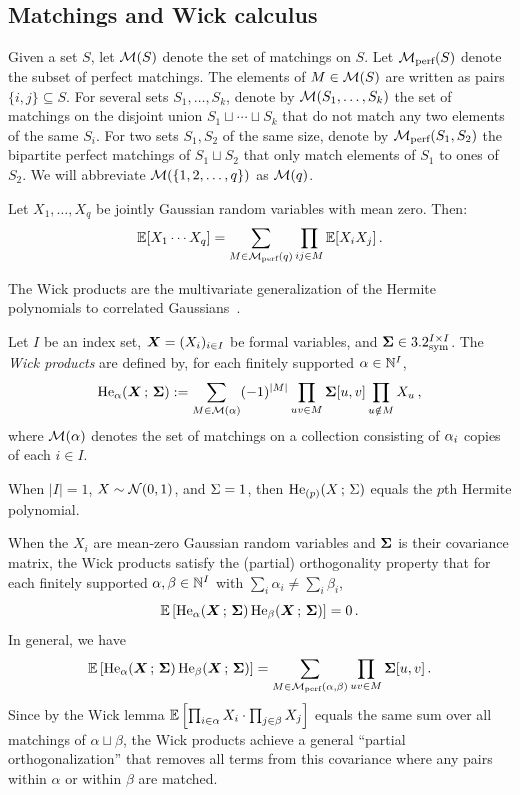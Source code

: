 \subsection{Matchings and Wick calculus}

Given a set $S$, let ${\cal M}(S)$ denote the set of matchings on $S$.
Let $\mathcal{M}_{\textnormal{perf}}(S)$ denote the subset of perfect matchings.
The elements of $M \in {\cal M}(S)$ are written as pairs $\{i,j\} \subseteq S$.
For several sets $S_1, \dots, S_k$, denote by ${\cal M}(S_1, \dots, S_k)$ the set of matchings on the disjoint union $S_1 \sqcup \cdots \sqcup S_k$ that do not match any two elements of the same $S_i$.
For two sets $S_1, S_2$ of the same size, denote by $\mathcal{M}_{\textnormal{perf}}(S_1, S_2)$ the bipartite perfect matchings of $S_1 \sqcup S_2$ that only match elements of $S_1$ to ones of $S_2$.
We will abbreviate ${\cal M}(\{1,2,\dots, q\})$ as ${\cal M}(q)$.

\begin{lemma}\label{lem:wick}
    Let $X_1, \dots, X_q$ be jointly Gaussian random variables with mean zero. Then:
    \begin{equation*}
        \operatorname*{\mathbb{E}}[X_1\cdots X_{q}] = \sum_{M \in \mathcal{M}_{\textnormal{perf}}(q)} \prod_{ij \in M} \operatorname*{\mathbb{E}}[X_iX_j]\,.
    \end{equation*}
\end{lemma}

The Wick products are the multivariate generalization of the Hermite polynomials to correlated Gaussians~\cite[Chapter 3]{Janson:GaussianHilbertSpaces}.

\begin{definition}
\label{def:wick}
    Let $I$ be an index set, ${\bm X} = (X_i)_{i \in I}$ be formal variables, and $\mathbf{\Sigma} \in 3.2_{\mathrm{sym}}^{I \times I}$. The {\em Wick products} are defined by, for each finitely supported $\alpha \in \mathbb{N}^I$,
    \[
       \operatorname{He}_{\alpha}({\bm X}\,;\, \mathbf{\Sigma}) := \sum_{M \in {\cal M}(\alpha)} (-1)^{|M|} \prod_{uv \in M}\mathbf{\Sigma}[u,v] \prod_{u\notin M} X_u\,,
    \]
    where ${\cal M}(\alpha)$ denotes the set of matchings on a collection consisting of $\alpha_i$ copies of each $i \in I$.
\end{definition}

\noindent When $|I| = 1$, $X\sim {\cal N}(0,1)$, and $\Sigma = 1$, then $\operatorname{He}_{(p)}(X\,;\, \Sigma)$ equals the $p$th
Hermite polynomial.

When the $X_i$ are mean-zero Gaussian random variables and $\mathbf{\Sigma}$
is their covariance matrix, the Wick products satisfy the
(partial) orthogonality property that for each
finitely supported $\alpha, \beta\in\mathbb{N}^I$ with $\sum_i \alpha_i \neq \sum_i \beta_i$,
\[
    \operatorname*{\mathbb{E}}\left[\operatorname{He}_{\alpha}({\bm X}\,;\, \mathbf{\Sigma}) \operatorname{He}_{\beta}({\bm X}\,;\, \mathbf{\Sigma})\right] = 0\,.
\]
In general, we have
\[ \operatorname*{\mathbb{E}}\left[\operatorname{He}_{\alpha}({\bm X}\,;\, \mathbf{\Sigma}) \operatorname{He}_{\beta}({\bm X}\,;\, \mathbf{\Sigma})\right] = \sum_{M \in \mathcal{M}_{\textnormal{perf}}(\alpha, \beta)} \prod_{uv \in M} \bm\Sigma[u, v]\,. \]
Since by the Wick lemma $\operatorname*{\mathbb{E}}\left[\prod_{i\in \alpha}X_i \cdot \prod_{j\in \beta} X_j\right]$ equals the same sum over all matchings of $\alpha \sqcup \beta$, the Wick products achieve a general ``partial orthogonalization'' that removes all terms from this covariance where any pairs within $\alpha$ or within $\beta$ are matched.

